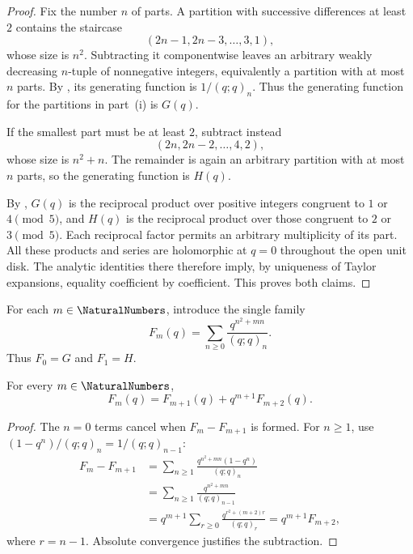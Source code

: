 \begin{proof}
Fix the number \(n\) of parts.  A partition with successive differences at
least \(2\) contains the staircase
\[
  (2n-1,2n-3,\ldots,3,1),
\]
whose size is \(n^2\).  Subtracting it componentwise leaves an arbitrary
weakly decreasing \(n\)-tuple of nonnegative integers, equivalently a
partition with at most \(n\) parts.  By
, its generating function is
\(1/(q;q)_n\).  Thus the generating function for the partitions in
part~\textup{(i)} is \(G(q)\).

If the smallest part must be at least \(2\), subtract instead
\[
  (2n,2n-2,\ldots,4,2),
\]
whose size is \(n^2+n\).  The remainder is again an arbitrary partition
with at most \(n\) parts, so the generating function is \(H(q)\).

By , \(G(q)\) is the reciprocal product over
positive integers congruent to \(1\) or \(4\pmod5\), and \(H(q)\) is
the reciprocal product over those congruent to \(2\) or \(3\pmod5\).
Each reciprocal factor permits an arbitrary multiplicity of its part.
All these products and series are holomorphic at \(q=0\) throughout the
open unit disk.  The analytic identities there therefore imply, by
uniqueness of Taylor expansions, equality coefficient by coefficient.
This proves both claims.
\end{proof}

For each \(m\in\NaturalNumbers\), introduce the single family
\begin{equation}
  F_m(q)=\sum_{n\ge0}\frac{q^{n^2+mn}}{(q;q)_n}.
  \label{qg:eq:rogers-family}
\end{equation}
Thus \(F_0=G\) and \(F_1=H\).

\begin{lemma}
\label{qg:lem-rogers-recurrence}
For every \(m\in\NaturalNumbers\),
\begin{equation}
  F_m(q)=F_{m+1}(q)+q^{m+1}F_{m+2}(q).
  \label{qg:eq:rogers-recurrence}
\end{equation}
\end{lemma}

\begin{proof}
The \(n=0\) terms cancel when \(F_m-F_{m+1}\) is formed.  For
\(n\ge1\), use
\((1-q^n)/(q;q)_n=1/(q;q)_{n-1}\):
\begin{align*}
 F_m-F_{m+1}
 &=\sum_{n\ge1}
   \frac{q^{n^2+mn}(1-q^n)}{(q;q)_n}\\
 &=\sum_{n\ge1}\frac{q^{n^2+mn}}{(q;q)_{n-1}}\\
 &=q^{m+1}\sum_{r\ge0}
   \frac{q^{r^2+(m+2)r}}{(q;q)_r}
 =q^{m+1}F_{m+2},
\end{align*}
where \(r=n-1\).  Absolute convergence justifies the subtraction.
\end{proof}

